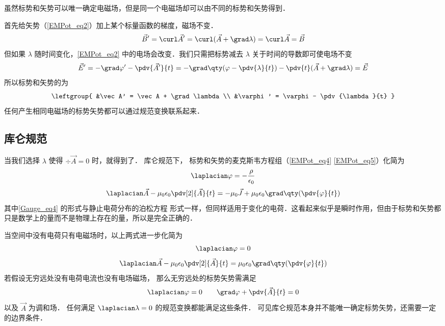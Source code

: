 
虽然标势和矢势可以唯一确定电磁场，但是同一个电磁场却可以由不同的标势和矢势得到．

首先给矢势（\autoref{EMPot_eq2}）加上某个标量函数的梯度，磁场不变．
\begin{equation}
\vec B' = \curl \vec A' = \curl (\vec A + \grad \lambda) = \curl \vec A = \vec B
\end{equation}
但如果 $\lambda$ 随时间变化，\autoref{EMPot_eq2} 中的电场会改变．我们只需把标势减去 $\lambda$ 关于时间的导数即可使电场不变
\begin{equation}
\vec E' = -\grad \varphi' - \pdv{\vec A'}{t} = -\grad \qty(\varphi - \pdv{\lambda}{t}) - \pdv{t} (\vec A + \grad \lambda) = \vec E
\end{equation}
所以标势和矢势的为
\begin{equation}\label{Gauge_eq3}
\leftgroup{
&\vec A' = \vec A + \grad \lambda\\
&\varphi' = \varphi - \pdv{\lambda}{t}
}\end{equation}
任何产生相同电磁场的标势矢势都可以通过规范变换联系起来．

\subsection{库仑规范}
当我们选择 $\lambda$ 使得 $\div \vec A = 0$ 时，就得到了． 库仑规范下， 标势和矢势的麦克斯韦方程组（\autoref{EMPot_eq4} \autoref{EMPot_eq5}）化简为
\begin{equation}\label{Gauge_eq4}
\laplacian \varphi = -\frac{\rho}{\epsilon_0}
\end{equation}
\begin{equation}\label{Gauge_eq5}
\laplacian \vec A - \mu_0\epsilon_0 \pdv[2]{\vec A}{t} = -\mu_0\vec J + \mu_0\epsilon_0 \grad\qty(\pdv{\varphi}{t})
\end{equation}
其中\autoref{Gauge_eq4} 的形式与静止电荷分布的泊松方程%
形式一样，但同样适用于变化的电荷．这看起来似乎是瞬时作用，但由于标势和矢势都只是数学上的量而不是物理上存在的量，所以是完全正确的．

当空间中没有电荷只有电磁场时，以上两式进一步化简为
\begin{equation}
\laplacian \varphi = 0
\end{equation}
\begin{equation}\label{Gauge_eq5}
\laplacian \vec A - \mu_0\epsilon_0 \pdv[2]{\vec A}{t} = \mu_0\epsilon_0 \grad\qty(\pdv{\varphi}{t})
\end{equation}
若假设无穷远处没有电荷电流也没有电场磁场， 那么无穷远处的标势矢势需满足
\begin{equation}
\laplacian \varphi = 0 \qquad
\grad \varphi + \pdv{\vec A}{t} = 0
\end{equation}
以及 $\vec A$ 为调和场． 任何满足 $\laplacian \lambda = 0$ 的规范变换都能满足这些条件． 可见库仑规范本身并不能唯一确定标势矢势，还需要一定的边界条件．

